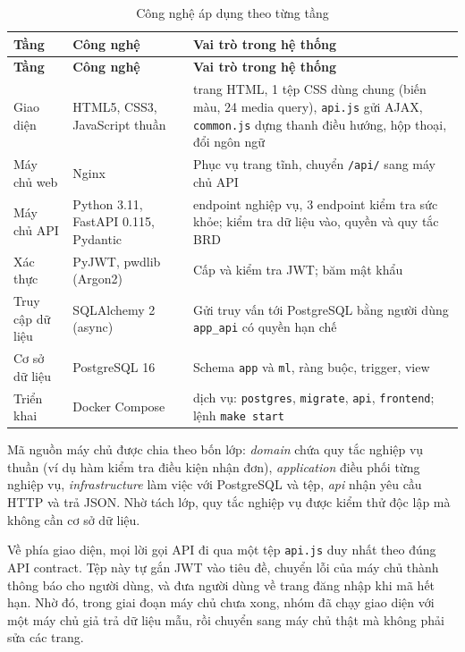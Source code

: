 {\small
\renewcommand{\arraystretch}{1.25}
\begin{longtable}{|>{\raggedright\arraybackslash}p{2.6cm}|>{\raggedright\arraybackslash}p{4.2cm}|>{\raggedright\arraybackslash}p{7.6cm}|}
\caption{Công nghệ áp dụng theo từng tầng}\label{tab:cong-nghe}\\ \hline
\textbf{Tầng} & \textbf{Công nghệ} & \textbf{Vai trò trong hệ thống} \\ \hline \endfirsthead
\hline \textbf{Tầng} & \textbf{Công nghệ} & \textbf{Vai trò trong hệ thống} \\ \hline \endhead
Giao diện & HTML5, CSS3, JavaScript thuần & 9 trang HTML, 1 tệp CSS dùng chung (biến màu, 24 media query), \texttt{api.js} gửi AJAX, \texttt{common.js} dựng thanh điều hướng, hộp thoại, đổi ngôn ngữ \\ \hline
Máy chủ web & Nginx & Phục vụ trang tĩnh, chuyển \texttt{/api/} sang máy chủ API \\ \hline
Máy chủ API & Python 3.11, FastAPI 0.115, Pydantic & 23 endpoint nghiệp vụ, 3 endpoint kiểm tra sức khỏe; kiểm tra dữ liệu vào, quyền và quy tắc BRD \\ \hline
Xác thực & PyJWT, pwdlib (Argon2) & Cấp và kiểm tra JWT; băm mật khẩu \\ \hline
Truy cập dữ liệu & SQLAlchemy 2 (async) & Gửi truy vấn tới PostgreSQL bằng người dùng \texttt{app\_api} có quyền hạn chế \\ \hline
Cơ sở dữ liệu & PostgreSQL 16 & Schema \texttt{app} và \texttt{ml}, ràng buộc, trigger, view \\ \hline
Triển khai & Docker Compose & 4 dịch vụ: \texttt{postgres}, \texttt{migrate}, \texttt{api}, \texttt{frontend}; lệnh \texttt{make start} \\ \hline
\end{longtable}
}

Mã nguồn máy chủ được chia theo bốn lớp: \textit{domain} chứa quy tắc nghiệp vụ thuần (ví dụ hàm
kiểm tra điều kiện nhận đơn), \textit{application} điều phối từng nghiệp vụ, \textit{infrastructure}
làm việc với PostgreSQL và tệp, \textit{api} nhận yêu cầu HTTP và trả JSON. Nhờ tách lớp, quy tắc
nghiệp vụ được kiểm thử độc lập mà không cần cơ sở dữ liệu.

Về phía giao diện, mọi lời gọi API đi qua một tệp \texttt{api.js} duy nhất theo đúng API contract.
Tệp này tự gắn JWT vào tiêu đề, chuyển lỗi của máy chủ thành thông báo cho người dùng, và đưa người
dùng về trang đăng nhập khi mã hết hạn. Nhờ đó, trong giai đoạn máy chủ chưa xong, nhóm đã chạy giao
diện với một máy chủ giả trả dữ liệu mẫu, rồi chuyển sang máy chủ thật mà không phải sửa các trang.


